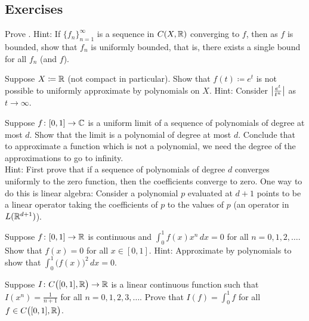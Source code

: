 \subsection{Exercises}

\begin{exercise}
Prove .
Hint: If $\{ f_n \}_{n=1}^\infty$ is a sequence in $C(X,{\mathbb{R}})$
converging to $f$, then as $f$ is bounded, show
that $f_n$ is uniformly bounded, that is, there exists a
single bound for all $f_n$ (and $f$).
\end{exercise}

\begin{exercise}
Suppose $X \coloneqq {\mathbb{R}}$ (not compact in particular).
Show that $f(t) \coloneqq e^t$ is not possible to uniformly approximate
by polynomials on $X$.  Hint: Consider $\bigl\lvert {\frac{e^t}{t^n}} \bigr\rvert$
as $t \to \infty$.
\end{exercise}

\begin{exercise}
Suppose $f \colon [0,1] \to {\mathbb{C}}$ is a uniform limit of a sequence of polynomials
of degree at most $d$.  Show that the limit is a polynomial of degree at most $d$.
Conclude that to approximate a function which is not a polynomial, we
need the degree of the approximations to go to infinity.\\
Hint: First prove that if a sequence of polynomials of degree $d$
converges uniformly to the zero function, then 
the coefficients converge to zero.
One way to do this is linear algebra: Consider a polynomial $p$
evaluated at $d+1$ points
to be a linear operator taking the
coefficients of $p$ to the values of $p$
(an operator in $L({\mathbb{R}}^{d+1})$).
\end{exercise}

\begin{exercise}
Suppose $f \colon [0,1] \to {\mathbb{R}}$ is continuous and
$\int_0^1 f(x) x^n \, dx = 0$ for all $n = 0,1,2,\ldots$.
Show that $f(x) = 0$ for all $x \in [0,1]$.
Hint: Approximate by polynomials to show that $\int_0^1 {\bigl( f(x)
\bigr)}^2 \, dx = 0$.
\end{exercise}

\begin{exercise}
Suppose $I \colon C\bigl([0,1],{\mathbb{R}}\bigr) \to {\mathbb{R}}$ is 
a linear continuous function such that
$I(x^n) = \frac{1}{n+1}$
for all $n=0,1,2,3,\ldots$.
Prove that $I(f) = \int_0^1 f$ for all $f \in C\bigl([0,1],{\mathbb{R}}\bigr)$.
\end{exercise}

